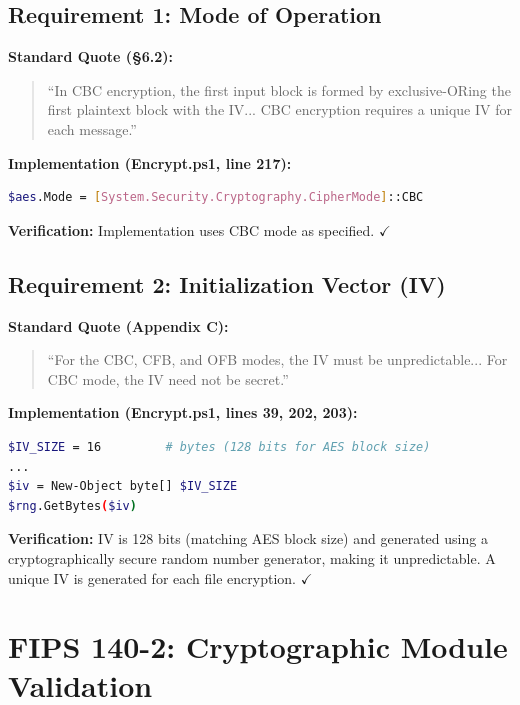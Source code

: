 \documentclass[11pt,letterpaper]{article}
\begin{document}
\subsection{Requirement 1: Mode of Operation}

\textbf{Standard Quote (§6.2):}
\begin{quote}
``In CBC encryption, the first input block is formed by exclusive-ORing the first plaintext block with the IV... CBC encryption requires a unique IV for each message.''
\end{quote}

\begin{samepage}
\textbf{Implementation (Encrypt.ps1, line 217):}
\begin{lstlisting}[language=bash]
$aes.Mode = [System.Security.Cryptography.CipherMode]::CBC
\end{lstlisting}
\textbf{Verification:} Implementation uses CBC mode as specified. $\checkmark$
\end{samepage}

\subsection{Requirement 2: Initialization Vector (IV)}

\textbf{Standard Quote (Appendix C):}
\begin{quote}
``For the CBC, CFB, and OFB modes, the IV must be unpredictable... For CBC mode, the IV need not be secret.''
\end{quote}

\begin{samepage}
\textbf{Implementation (Encrypt.ps1, lines 39, 202, 203):}
\begin{lstlisting}[language=bash]
$IV_SIZE = 16         # bytes (128 bits for AES block size)
...
$iv = New-Object byte[] $IV_SIZE
$rng.GetBytes($iv)
\end{lstlisting}
\textbf{Verification:} IV is 128 bits (matching AES block size) and generated using a cryptographically secure random number generator, making it unpredictable. A unique IV is generated for each file encryption. $\checkmark$
\end{samepage}

\newpage
\section{FIPS 140-2: Cryptographic Module Validation}
\end{document}
